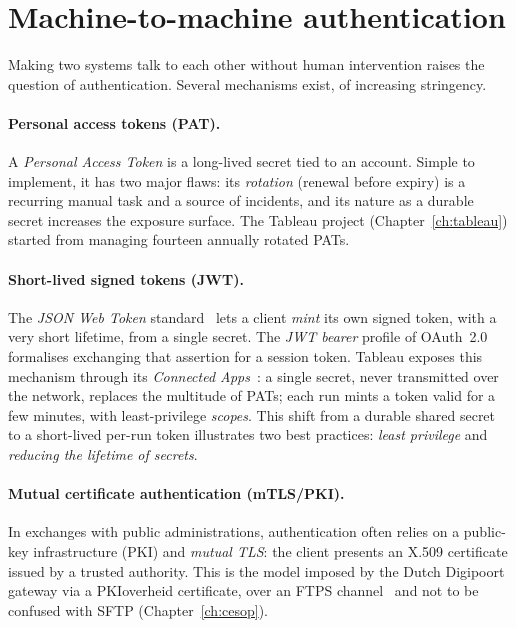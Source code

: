 \section{Machine-to-machine authentication}

Making two systems talk to each other without human intervention raises the question of authentication. Several mechanisms exist, of increasing stringency.

\paragraph{Personal access tokens (PAT).} A \emph{Personal Access Token} is a long-lived secret tied to an account. Simple to implement, it has two major flaws: its \emph{rotation} (renewal before expiry) is a recurring manual task and a source of incidents, and its nature as a durable secret increases the exposure surface. The Tableau project (Chapter~\ref{ch:tableau}) started from managing fourteen annually rotated PATs.

\paragraph{Short-lived signed tokens (JWT).} The \emph{JSON Web Token} standard~\cite{rfc7519} lets a client \emph{mint} its own signed token, with a very short lifetime, from a single secret. The \emph{JWT bearer} profile of OAuth~2.0~\cite{rfc7523} formalises exchanging that assertion for a session token. Tableau exposes this mechanism through its \emph{Connected Apps}~\cite{tableau-connectedapps}: a single secret, never transmitted over the network, replaces the multitude of PATs; each run mints a token valid for a few minutes, with least-privilege \emph{scopes}. This shift from a durable shared secret to a short-lived per-run token illustrates two best practices: \emph{least privilege} and \emph{reducing the lifetime of secrets}.

\paragraph{Mutual certificate authentication (mTLS/PKI).} In exchanges with public administrations, authentication often relies on a public-key infrastructure (PKI) and \emph{mutual TLS}: the client presents an X.509 certificate issued by a trusted authority. This is the model imposed by the Dutch Digipoort gateway via a PKIoverheid certificate, over an FTPS channel~\cite{rfc4217} and not to be confused with SFTP (Chapter~\ref{ch:cesop}).

